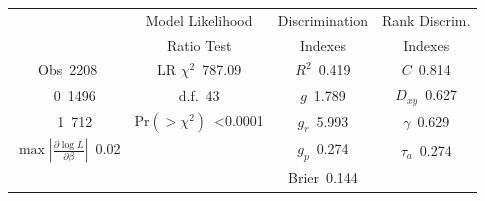 \documentclass[]{interact}
\theoremstyle{plain}%
\theoremstyle{definition}
\theoremstyle{remark}
\begin{document}
\begin{center}\small
\begin{tabular}{|c|c|c|c|}\hline
&Model Likelihood&Discrimination&Rank Discrim.\\
&Ratio Test&Indexes&Indexes\\\hline
Obs~\hfill 2208&LR $\chi^{2}$~\hfill 787.09&$R^{2}$~\hfill 0.419&$C$~\hfill 0.814\\
~~0~\hfill 1496&d.f.~\hfill 43&$g$~\hfill 1.789&$D_{xy}$~\hfill 0.627\\
~~1~\hfill 712&Pr$(>\chi^{2})$~\hfill \textless 0.0001&$g_{r}$~\hfill 5.993&$\gamma$~\hfill 0.629\\
$\max|\frac{\partial\log L}{\partial \beta}|$~\hfill 0.02&&$g_{p}$~\hfill 0.274&$\tau_{a}$~\hfill 0.274\\
&&Brier~\hfill 0.144&\\
\hline
\end{tabular}
\end{center}
\end{document}
